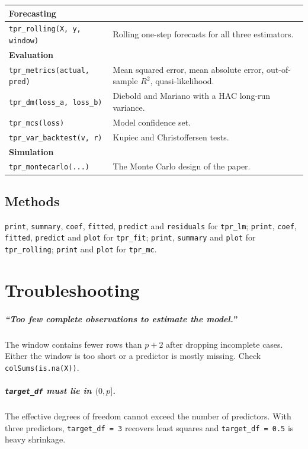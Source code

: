 \documentclass[11pt,a4paper]{report}
\begin{document}
\begin{longtable}{p{} p{}}
\addlinespace
\toprule
\textbf{Forecasting} & \\
\midrule
\texttt{tpr\_rolling(X, y, window)} & Rolling one-step forecasts for all
three estimators. \\
\addlinespace
\toprule
\textbf{Evaluation} & \\
\midrule
\texttt{tpr\_metrics(actual, pred)} & Mean squared error, mean absolute
error, out-of-sample $R^2$, quasi-likelihood. \\
\texttt{tpr\_dm(loss\_a, loss\_b)} & Diebold and Mariano with a HAC
long-run variance. \\
\texttt{tpr\_mcs(loss)} & Model confidence set. \\
\texttt{tpr\_var\_backtest(v, r)} & Kupiec and Christoffersen tests. \\
\addlinespace
\toprule
\textbf{Simulation} & \\
\midrule
\texttt{tpr\_montecarlo(...)} & The Monte Carlo design of the paper. \\
\bottomrule
\end{longtable}

\section{Methods}

\texttt{print}, \texttt{summary}, \texttt{coef}, \texttt{fitted},
\texttt{predict} and \texttt{residuals} for \texttt{tpr\_lm};
\texttt{print}, \texttt{coef}, \texttt{fitted}, \texttt{predict} and
\texttt{plot} for \texttt{tpr\_fit}; \texttt{print}, \texttt{summary}
and \texttt{plot} for \texttt{tpr\_rolling}; \texttt{print} and
\texttt{plot} for \texttt{tpr\_mc}.

\chapter{Troubleshooting}

\paragraph{``Too few complete observations to estimate the model.''}
The window contains fewer rows than $p+2$ after dropping incomplete
cases. Either the window is too short or a predictor is mostly missing.
Check \texttt{colSums(is.na(X))}.

\paragraph{\texttt{target\_df} must lie in $(0, p]$.}
The effective degrees of freedom cannot exceed the number of predictors.
With three predictors, \texttt{target\_df = 3} recovers least squares and
\texttt{target\_df = 0.5} is heavy shrinkage.
\end{document}
